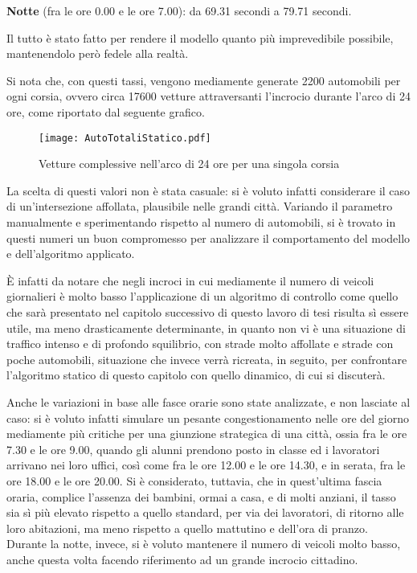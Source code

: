 \textbf{Notte} (fra le ore 0.00 e le ore 7.00): da 69.31 secondi a 79.71 secondi.

Il tutto è stato fatto per rendere il modello quanto più imprevedibile possibile, mantenendolo però fedele alla realtà.

Si nota che, con questi tassi, vengono mediamente generate 2200 automobili per ogni corsia, ovvero circa 17600 vetture attraversanti l’incrocio durante l’arco di 24 ore, come riportato dal seguente grafico.

\begin{figure}[H]
	\centering
	\texttt{[image: AutoTotaliStatico.pdf]}
	\caption{Vetture complessive nell'arco di 24 ore per una singola corsia}
\end{figure}
\newpage

La scelta di questi valori non è stata casuale: si è voluto infatti considerare il caso di un’intersezione affollata, plausibile nelle grandi città. Variando il parametro manualmente e sperimentando rispetto al numero di automobili, si è trovato in questi numeri un buon compromesso per analizzare il comportamento del modello e dell’algoritmo applicato. 

È infatti da notare che negli incroci in cui mediamente il numero di veicoli giornalieri è molto basso l’applicazione di un algoritmo di controllo come quello che sarà presentato nel capitolo successivo di questo lavoro di tesi risulta sì essere utile, ma meno drasticamente determinante, in quanto non vi è una situazione di traffico intenso e di profondo squilibrio, con strade molto affollate e strade con poche automobili, situazione che invece verrà ricreata, in seguito, per confrontare l’algoritmo statico di questo capitolo con quello dinamico, di cui si discuterà. 

Anche le variazioni in base alle fasce orarie sono state analizzate, e non lasciate al caso: si è voluto infatti simulare un pesante congestionamento nelle ore del giorno mediamente più critiche per una giunzione strategica di una città, ossia fra le ore 7.30 e le ore 9.00, quando gli alunni prendono posto in classe ed i lavoratori arrivano nei loro uffici, così come fra le ore 12.00 e le ore 14.30, e in serata, fra le ore 18.00 e le ore 20.00. Si è considerato, tuttavia, che in quest’ultima fascia oraria, complice l’assenza dei bambini, ormai a casa, e di molti anziani, il tasso sia sì più elevato rispetto a quello standard, per via dei lavoratori, di ritorno alle loro abitazioni, ma meno rispetto a quello mattutino e dell’ora di pranzo.
Durante la notte, invece, si è voluto mantenere il numero di veicoli molto basso, anche questa volta facendo riferimento ad un grande incrocio cittadino. 

